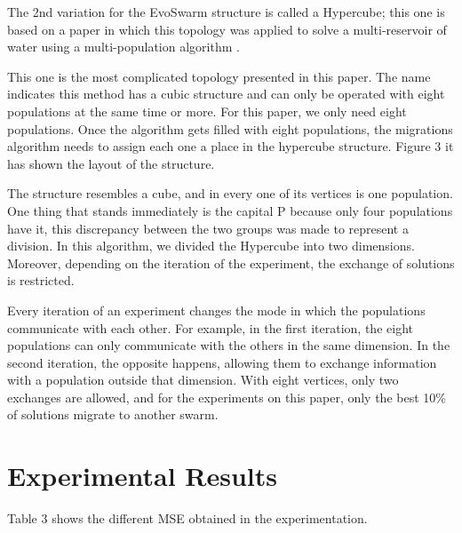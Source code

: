 \documentclass[runningheads]{llncs}
\begin{document}
The 2nd variation for the EvoSwarm structure is called a Hypercube; this one is
based on a paper in which this topology was applied to solve a multi-reservoir
of water using a multi-population algorithm \cite{b20}.  

This one is the most complicated topology presented in this paper. The name
indicates this method has a cubic structure and can only be operated with eight
populations at the same time or more. For this paper, we only need eight
populations. Once the algorithm gets filled with eight populations, the
migrations algorithm needs to assign each one a place in the hypercube
structure. Figure 3 it has shown the layout of the structure.


The structure resembles a cube, and in every one of its vertices is
one population. One thing that stands immediately is the capital P
because only four populations have it, this discrepancy between the
two groups was made to represent a division. In this algorithm, we
divided the Hypercube into two dimensions. Moreover, depending on
the %
iteration of the experiment, the exchange of solutions is restricted.

Every iteration of an experiment changes the mode in which the
populations communicate with each other. For example, in the first
iteration, the eight populations can only communicate with the others
in the same dimension. In the second iteration, the opposite happens,
allowing them to exchange information with a population outside that
dimension.   With eight vertices, only two exchanges are allowed, and
for the experiments on this paper, only the best 10\% of solutions
migrate to another swarm.

\section{Experimental Results}


Table 3 shows the different MSE obtained in the experimentation. %
\end{document}
